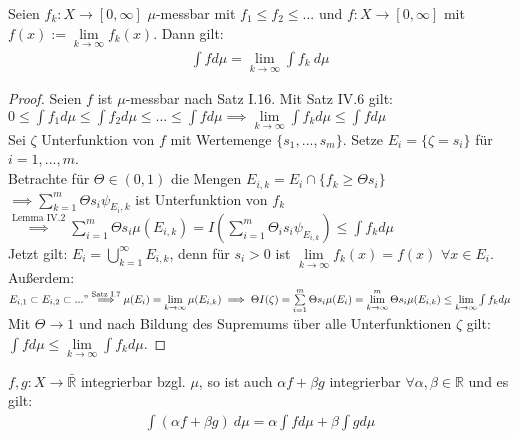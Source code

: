   \newpage
  \begin{theorem}
    Seien $f_k:X \to [0,\infty]$ $\mu$-messbar mit $f_1 \leq f_2 \leq ...$ und $f: X \to [0, \infty]$ mit $f(x) := \lim\limits_{k \to \infty} f_k(x)$. Dann gilt:
    \begin{align*}
      \int f d\mu = \lim\limits_{k \to \infty} \int f_k \ d\mu
    \end{align*}
  \end{theorem}

  \begin{proof}
	Seien $f$ ist $\mu$-messbar nach Satz I.16. Mit Satz IV.6 gilt: \\ 
	$0 \leq \int f_1 d\mu \leq \int f_2 d\mu \leq ... \leq \int f d\mu \implies \lim\limits_{k\to\infty} \int f_k d\mu \leq \int f d\mu$ \\
	Sei $\zeta$ Unterfunktion von $f$ mit Wertemenge $\{s_1, ..., s_m\}$. Setze $E_i = \{\zeta = s_i\}$ für $i=1,...,m$. \\ 
	Betrachte für $\Theta \in (0,1)$ die Mengen $E_{i,k} = E_i \cap \{f_k \geq \Theta s_i\} $ \\
	$\implies \sum\limits_{k=1}^m \Theta s_i \psi_{E_i,k}$ ist Unterfunktion von $f_k$ \\
	$\overset{\text{Lemma IV.2}}{\implies} \sum\limits_{i=1}^m \Theta s_i \mu (E_{i,k}) = I(\sum\limits_{i=1}^m \Theta_i s_i \psi_{E_{i,k}})\leq \int f_k d\mu$ \\
	Jetzt gilt: $E_i = \bigcup\limits_{k=1}^\infty E_{i,k}$, denn für $s_i > 0$ ist $\lim\limits_{k\to\infty} f_k(x) = f(x)$ $\forall x\in E_i$. \\ 
	Außerdem: $E_{i,1} \subset E_{i,2} \subset ..." \overset{\text{Satz I.7}}{\implies} \mu (E_i) = \lim\limits_{k\to\infty}\mu (E_{i,k})\\ 
	\implies \Theta I(\zeta) = \sum\limits_{i=1}^m \Theta s_i \mu (E_i) = \lim\limits_{k\to\infty}^m \Theta s_i \mu (E_{i,k}) \leq \lim\limits_{k\to\infty} \int f_k d\mu$ \\
	Mit $\Theta \to 1$ und nach Bildung des Supremums über alle Unterfunktionen $\zeta$ gilt: \\ $\int f d\mu \leq \lim\limits_{k\to\infty} \int f_k d\mu$.
  \end{proof}

  \begin{theorem}
    $f,g: X \to \bar{\mathbb{R}}$ integrierbar bzgl. $\mu$, so ist auch $\alpha f + \beta g$ integrierbar $\forall \alpha, \beta \in \mathbb{R}$ und es gilt:
    \begin{align*}
      \int (\alpha f + \beta g) \ d\mu = \alpha \int f d\mu + \beta \int g d\mu
    \end{align*}
  \end{theorem}

